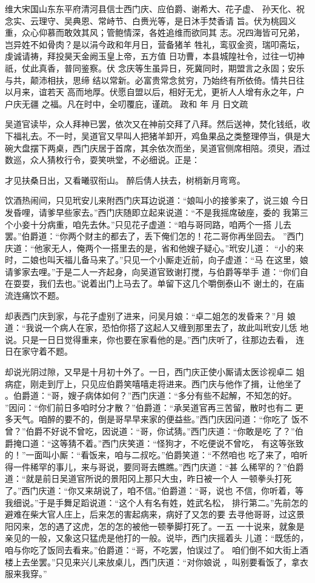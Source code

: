 维大宋国山东东平府清河县信士西门庆、应伯爵、谢希大、花子虚、
孙天化、祝念实、云理守、吴典恩、常峙节、白赉光等，是日沐手焚香请
旨。伏为桃园义重，众心仰慕而敢效其风；管鲍情深，各姓追维而欲同其
志。况四海皆可兄弟，岂异姓不如骨肉？是以涓今政和年月日，营备猪羊
牲礼，鸾驭金资，瑞叩斋坛，虔诚请祷，拜投昊天金阙玉皇上帝，五方值
日功曹，本县城隍社令，过往一切神祇，仗此真香，普同鉴察。伏
念庆等生虽异日，死冀同时，期盟言之永固；安乐与共，颠沛相扶，思缔
结以常新。必富贵常念贫穷，乃始终有所依倚。情共日往以月来，谊若天
高而地厚。伏愿自盟以后，相好无尤，更祈人人增有永之年，户户庆无疆
之福。凡在时中，全叨覆庇，谨疏。
政和  年  月  日文疏

吴道官读毕，众人拜神已罢，依次又在神前交拜了八拜。然后送神，焚化钱纸，收
下福礼去。不一时，吴道官又早叫人把猪羊卸开，鸡鱼果品之类整理停当，俱是大
碗大盘摆下两桌，西门庆居于首席，其余依次而坐，吴道官侧席相陪。须臾，酒过
数巡，众人猜枚行令，耍笑哄堂，不必细说。正是：

才见扶桑日出，又看曦驭衔山。
醉后倩人扶去，树梢新月弯弯。

饮酒热闹间，只见玳安儿来附西门庆耳边说道：“娘叫小的接爹来了，说三娘
今日发昏哩，请爹早些家去。”西门庆随即立起来说道：“不是我摇席破座，委的
我第三个小妾十分病重，咱先去休。”只见花子虚道：“咱与哥同路，咱两个一搭
儿去罢。”伯爵道：“你两个财主的都去了，丢下俺们怎的！花二哥你再坐回去。
”西门庆道：“他家无人，俺两个一搭里去的是，省和他嫂子疑心。”玳安儿道：
“小的来时，二娘也叫天福儿备马来了。”只见一个小厮走近前，向子虚道：“马
在这里，娘请爹家去哩。”于是二人一齐起身，向吴道官致谢打搅，与伯爵等举手
道：“你们自在耍耍，我们去也。”说着出门上马去了。单留下这几个嚼倒泰山不
谢土的，在庙流连痛饮不题。

却表西门庆到家，与花子虚别了进来，问吴月娘：“卓二姐怎的发昏来？”月
娘道：“我说一个病人在家，恐怕你搭了这起人又缠到那里去了，故此叫玳安儿恁
地说。只是一日日觉得重来，你也要在家看他的是。”西门庆听了，往那边去看，
连日在家守着不题。

却说光阴过隙，又早是十月初十外了。一日，西门庆正使小厮请太医诊视卓二
姐病症，刚走到厅上，只见应伯爵笑嘻嘻走将进来。西门庆与他作了揖，让他坐了
。伯爵道：“哥，嫂子病体如何？”西门庆道：“多分有些不起解，不知怎的好。
”因问：“你们前日多咱时分才散？”伯爵道：“承吴道官再三苦留，散时也有二
更多天气。咱醉的要不的，倒是哥早早来家的便益些。”西门庆因问道：“你吃了
饭不曾？”伯爵不好说不曾吃，因说道：“哥，你试猜。”西门庆道：“你敢是吃
了？”伯爵掩口道：“这等猜不着。”西门庆笑道：“怪狗才，不吃便说不曾吃，
有这等张致的！”一面叫小厮：“看饭来，咱与二叔吃。”伯爵笑道：“不然咱也
吃了来了，咱听得一件稀罕的事儿，来与哥说，要同哥去瞧瞧。”西门庆道：“甚
么稀罕的？”伯爵道：“就是前日吴道官所说的景阳冈上那只大虫，昨日被一个人
一顿拳头打死了。”西门庆道：“你又来胡说了，咱不信。”伯爵道：“哥，说也
不信，你听着，等我细说。”于是手舞足蹈说道：“这个人有名有姓，姓武名松，
排行第二。”先前怎的避难在柴大官人庄上，后来怎的害起病来，病好了又怎的要
去寻他哥哥，过这景阳冈来，怎的遇了这虎，怎的怎的被他一顿拳脚打死了。一五
一十说来，就象是亲见的一般，又象这只猛虎是他打的一般。说毕，西门庆摇着头
儿道：“既恁的，咱与你吃了饭同去看来。”伯爵道：“哥，不吃罢，怕误过了。
咱们倒不如大街上酒楼上去坐罢。”只见来兴儿来放桌儿，西门庆道：“对你娘说
，叫别要看饭了，拿衣服来我穿。”

